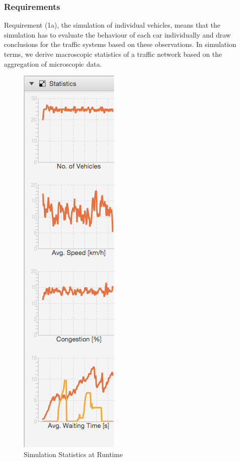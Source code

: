 \subsubsection{Requirements}
Requirement (1a), the simulation of individual vehicles, means that the simulation has to evaluate the behaviour of each car individually and draw conclusions for the traffic systems based on these observations. In simulation terms, we derive macroscopic statistics of a traffic network based on the aggregation of microscopic data.

\begin{figure}
	\begin{center}
		\includegraphics[scale=0.5]{img/graphs.png}
		\caption[Simulation Statistics at Runtime]{Simulation Statistics at Runtime}
		\label{fig:graphs}
	\end{center}
\end{figure}

